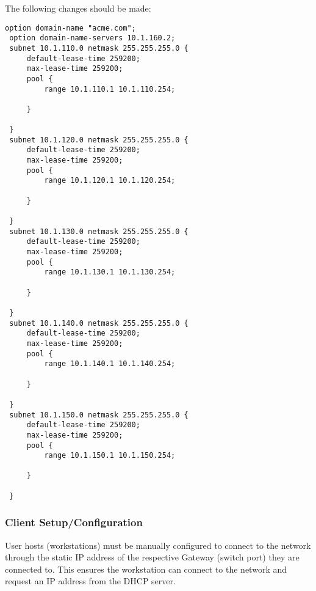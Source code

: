 \noindent
The following changes should be made:
\begin{lstlisting}[backgroundcolor=\color{Gray}]
 option domain-name "acme.com";
 option domain-name-servers 10.1.160.2;
 subnet 10.1.110.0 netmask 255.255.255.0 {
     default-lease-time 259200;
     max-lease-time 259200;
     pool {
         range 10.1.110.1 10.1.110.254;

     }

 }
 subnet 10.1.120.0 netmask 255.255.255.0 {
     default-lease-time 259200;
     max-lease-time 259200;
     pool {
         range 10.1.120.1 10.1.120.254;

     }

 }
 subnet 10.1.130.0 netmask 255.255.255.0 {
     default-lease-time 259200;
     max-lease-time 259200;
     pool {
         range 10.1.130.1 10.1.130.254;

     }

 }
 subnet 10.1.140.0 netmask 255.255.255.0 {
     default-lease-time 259200;
     max-lease-time 259200;
     pool {
         range 10.1.140.1 10.1.140.254;

     }

 }
 subnet 10.1.150.0 netmask 255.255.255.0 {
     default-lease-time 259200;
     max-lease-time 259200;
     pool {
         range 10.1.150.1 10.1.150.254;

     }

 }
\end{lstlisting}

\subsubsection{Client Setup/Configuration}
User hosts (workstations) must be manually configured to connect to the network
through the static IP address of the respective Gateway (switch port) they are
connected to. This ensures the workstation can connect to the network and
request an IP address from the DHCP server.
